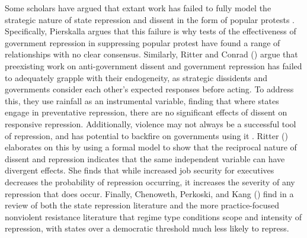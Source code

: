 Some scholars have argued that extant work has failed to fully model the strategic nature of state repression and dissent in the form of popular protests \cite{Pierskalla10}. Specifically, Pierskalla argues that this failure is why tests of the effectiveness of government repression in suppressing popular protest have found a range of relationships with no clear consensus. Similarly, Ritter and Conrad (\citeyear{rc2016}) argue that preexisting work on anti-government dissent and government repression has failed to adequately grapple with their endogeneity, as strategic dissidents and governments consider each other’s expected responses before acting. To address this, they use rainfall as an instrumental variable, finding that where states engage in preventative repression, there are no significant effects of dissent on responsive repression. Additionally, violence may not always be a successful tool of repression, and has potential to backfire on governments using it \cite{Suttonetal14}. Ritter (\citeyear{Ritter14}) elaborates on this by using a formal model to show that the reciprocal nature of dissent and repression indicates that the same independent variable can have divergent effects. She finds that while increased job security for executives decreases the probability of repression occurring, it increases the severity of any repression that does occur. Finally, Chenoweth, Perkoski, and Kang (\citeyear{Chenowethetal17}) find in a review of both the state repression literature and the more practice-focused nonviolent resistance literature that regime type conditions scope and intensity of repression, with states over a democratic threshold much less likely to repress.

